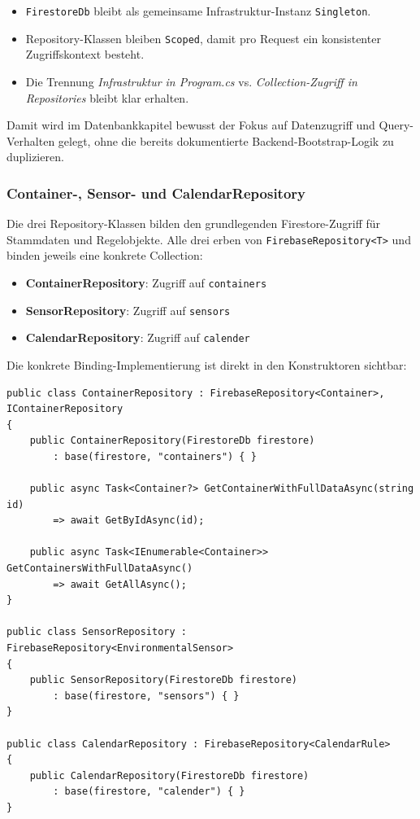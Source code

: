 \begin{itemize}
    \item \texttt{FirestoreDb} bleibt als gemeinsame Infrastruktur-Instanz \texttt{Singleton}.
    \item Repository-Klassen bleiben \texttt{Scoped}, damit pro Request ein konsistenter Zugriffskontext besteht.
    \item Die Trennung \textit{Infrastruktur in Program.cs} vs. \textit{Collection-Zugriff in Repositories} bleibt klar erhalten.
\end{itemize}

Damit wird im Datenbankkapitel bewusst der Fokus auf Datenzugriff und Query-Verhalten gelegt, ohne die bereits dokumentierte Backend-Bootstrap-Logik zu duplizieren.

\subsubsection{Container-, Sensor- und CalendarRepository}

Die drei Repository-Klassen bilden den grundlegenden Firestore-Zugriff für Stammdaten und Regelobjekte. Alle drei erben von \texttt{FirebaseRepository<T>} und binden jeweils eine konkrete Collection:

\begin{itemize}
    \item \textbf{ContainerRepository}: Zugriff auf \texttt{containers}
    \item \textbf{SensorRepository}: Zugriff auf \texttt{sensors}
    \item \textbf{CalendarRepository}: Zugriff auf \texttt{calender}
\end{itemize}

Die konkrete Binding-Implementierung ist direkt in den Konstruktoren sichtbar:

\begin{lstlisting}[language={[Sharp]C},caption={Collection-Bindung der Basis-Repositories},label={lst:db:repos:bindings},basicstyle=\ttfamily\small,breaklines=true,breakatwhitespace=false,columns=fullflexible]
public class ContainerRepository : FirebaseRepository<Container>, IContainerRepository
{
    public ContainerRepository(FirestoreDb firestore)
        : base(firestore, "containers") { }

    public async Task<Container?> GetContainerWithFullDataAsync(string id)
        => await GetByIdAsync(id);

    public async Task<IEnumerable<Container>> GetContainersWithFullDataAsync()
        => await GetAllAsync();
}

public class SensorRepository : FirebaseRepository<EnvironmentalSensor>
{
    public SensorRepository(FirestoreDb firestore)
        : base(firestore, "sensors") { }
}

public class CalendarRepository : FirebaseRepository<CalendarRule>
{
    public CalendarRepository(FirestoreDb firestore)
        : base(firestore, "calender") { }
}
\end{lstlisting}


